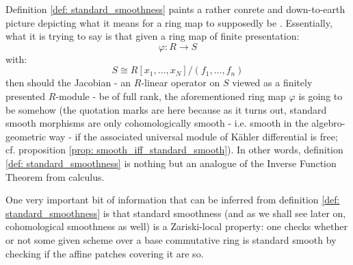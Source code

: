                 \begin{remark} \label{remark: standard_smoothness}
                    Definition \ref{def: standard_smoothness} paints a rather conrete and down-to-earth picture depicting what it means for a ring map to supposedly be . Essentially, what it is trying to say is that given a ring map of finite presentation:
                        $$\varphi: R \to S$$
                    with:
                        $$S \cong R[x_1, ..., x_N]/(f_1, ..., f_n)$$
                    then should the Jacobian - an $R$-linear operator on $S$ viewed as a finitely presented $R$-module - be of full rank, the aforementioned ring map $\varphi$ is going to be somehow  (the quotation marks are here because as it turns out, standard smooth morphisms are only cohomologically smooth - i.e. smooth in the  algebro-geometric way - if the associated universal module of K\"ahler differential is free; cf. proposition \ref{prop: smooth_iff_standard_smooth}). In other words, definition \ref{def: standard_smoothness} is nothing but an analogue of the Inverse Function Theorem from calculus. 
                \end{remark}
                \begin{remark}
                    One very important bit of information that can be inferred from definition \ref{def: standard_smoothness} is that standard smoothness (and as we shall see later on, cohomological smoothness as well) is a Zariski-local property: one checks whether or not some given scheme over a base commutative ring is standard smooth by checking if the affine patches covering it are so. 
                \end{remark}
                
